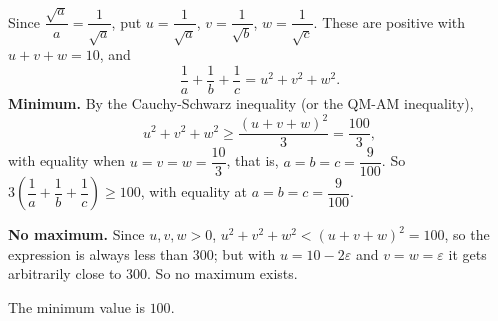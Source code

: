 Since $\dfrac{\sqrt a}{a}=\dfrac{1}{\sqrt a}$, put $u=\dfrac1{\sqrt a}$, $v=\dfrac1{\sqrt b}$, $w=\dfrac1{\sqrt c}$. These are positive with $u+v+w=10$, and
\[\dfrac1a+\dfrac1b+\dfrac1c=u^2+v^2+w^2.\]
\textbf{Minimum.} By the Cauchy-Schwarz inequality (or the QM-AM inequality),
\[u^2+v^2+w^2\ge\dfrac{(u+v+w)^2}{3}=\dfrac{100}{3},\]
with equality when $u=v=w=\dfrac{10}3$, that is, $a=b=c=\dfrac9{100}$. So $3\left(\dfrac1a+\dfrac1b+\dfrac1c\right)\ge100$, with equality at $a=b=c=\dfrac{9}{100}$.

\textbf{No maximum.} Since $u,v,w>0$, $u^2+v^2+w^2<(u+v+w)^2=100$, so the expression is always less than $300$; but with $u=10-2\varepsilon$ and $v=w=\varepsilon$ it gets arbitrarily close to $300$. So no maximum exists.

The minimum value is $\boxed{100}$.
